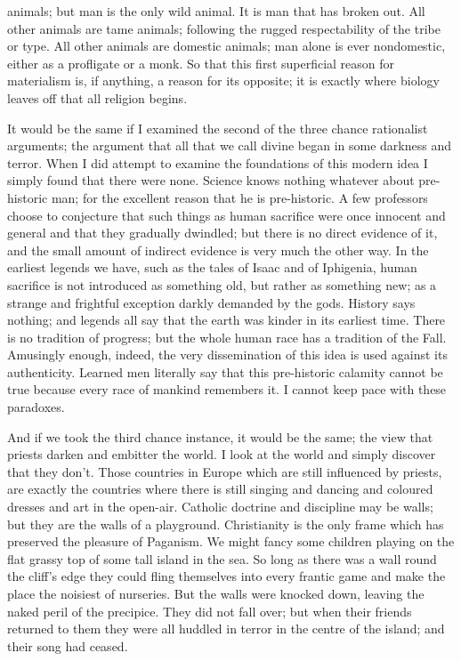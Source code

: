 \documentclass{book}
\begin{document}
animals; but man is the only wild animal. It is man that has broken out. All other animals are tame animals; following the rugged respectability of the tribe or type. All other animals are domestic animals; man alone is ever nondomestic, either as a profligate or a monk. So that this first superficial reason for materialism is, if anything, a reason for its opposite; it is exactly where biology leaves off that all religion begins.

It would be the same if I examined the second of the three chance rationalist arguments; the argument that all that we call divine began in some darkness and terror. When I did attempt to examine the foundations of this modern idea I simply found that there were none. Science knows nothing whatever about pre-historic man; for the excellent reason that he is pre-historic. A few professors choose to conjecture that such things as human sacrifice were once innocent and general and that they gradually dwindled; but there is no direct evidence of it, and the small amount of indirect evidence is very much the other way. In the earliest legends we have, such as the tales of Isaac and of Iphigenia, human sacrifice is not introduced as something old, but rather as something new; as a strange and frightful exception darkly demanded by the gods. History says nothing; and legends all say that the earth was kinder in its earliest time. There is no tradition of progress; but the whole human race has a tradition of the Fall. Amusingly enough, indeed, the very dissemination of this idea is used against its authenticity. Learned men literally say that this pre-historic calamity cannot be true because every race of mankind remembers it. I cannot keep pace with these paradoxes.

And if we took the third chance instance, it would be the same; the view that priests darken and embitter the world. I look at the world and simply discover that they don’t. Those countries in Europe which are still influenced by priests, are exactly the countries where there is still singing and dancing and coloured dresses and art in the open-air. Catholic doctrine and discipline may be walls; but they are the walls of a playground. Christianity is the only frame which has preserved the pleasure of Paganism. We might fancy some children playing on the flat grassy top of some tall island in the sea. So long as there was a wall round the cliff’s edge they could fling themselves into every frantic game and make the place the noisiest of nurseries. But the walls were knocked down, leaving the naked peril of the precipice. They did not fall over; but when their friends returned to them they were all huddled in terror in the centre of the island; and their song had ceased.
\end{document}
